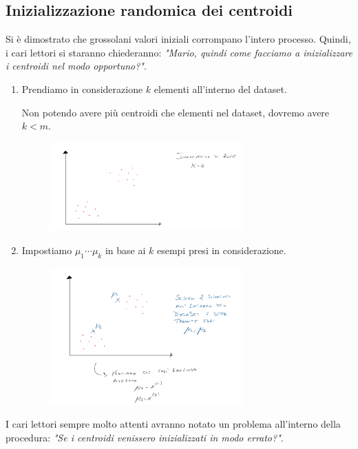 \subsection{Inizializzazione randomica dei centroidi}
Si è dimostrato che grossolani valori iniziali corrompano l'intero processo. Quindi, i cari lettori si staranno chiederanno: \textit{"Mario, quindi come facciamo a inizializzare i centroidi nel modo opportuno?"}.
\begin{enumerate}
    \item Prendiamo in considerazione $k$ elementi all'interno del dataset.
    \begin{nota}
    Non potendo avere più centroidi che elementi nel dataset, dovremo avere $k<m$.
    \end{nota}
     \begin{figure}[H]
    \centering
    \includegraphics[width=0.7\textwidth]{img/kmeans7.PNG}
\end{figure}
    \item Impostiamo $\mu_1 \cdots \mu_k$ in base ai $k$ esempi presi in considerazione.
     \begin{figure}[H]
    \centering
    \includegraphics[width=0.7\textwidth]{img/kmeans8.PNG}
\end{figure}
\end{enumerate}
I cari lettori sempre molto attenti avranno notato un problema all'interno della procedura: \textit{"Se i centroidi venissero inizializzati in modo errato?"}.
